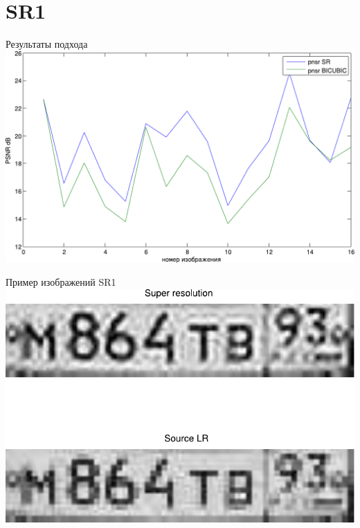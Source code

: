 \section{SR1}
\begin{frame}{Результаты подхода}
  \includegraphics[width=\columnwidth]{content/pnsr_for_big_jpeg.pdf}
\end{frame}
\begin{frame}{Пример изображений SR1}
  \includegraphics[width=\columnwidth]{content/compare_result_sr1.pdf}
\end{frame}

